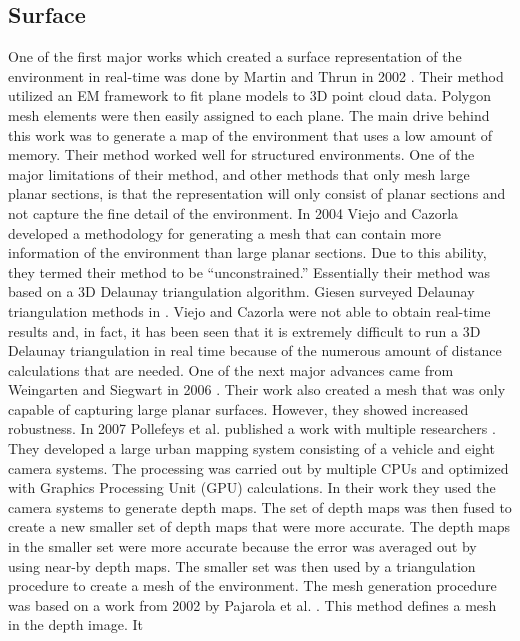 \subsection{Surface}

One of the first major works which created a surface representation of the
environment in real-time was done by Martin and Thrun in 2002
\cite{Martin2002}. Their method utilized an EM framework to fit plane
models to 3D point cloud data. Polygon mesh elements were then easily
assigned to each plane. The main drive behind this work was to generate a
map of the environment that uses a low amount of memory. Their  method
worked well for structured environments. One of the major limitations of
their method, and other methods that only mesh large planar sections, is
that the representation will only consist of planar sections and not
capture the fine detail of the environment. In 2004 Viejo and Cazorla
\cite{springerlink:10.1007/978-3-540-30463-0_30} developed a methodology
for generating a mesh that can contain more information of the environment
than large planar sections. Due to this ability, they termed their method
to be ``unconstrained.'' Essentially their method was based on a 3D
Delaunay triangulation algorithm. Giesen surveyed Delaunay triangulation
methods in \cite{Giesen2004}. Viejo and Cazorla were not able to obtain
real-time results and, in fact, it has been seen that it is extremely
difficult to run a 3D Delaunay triangulation in real time because of the
numerous amount of distance calculations that are needed.  One of the next
major advances came from Weingarten and Siegwart in 2006
\cite{Weingarten2006}. Their work also created a mesh that was only capable
of capturing large planar surfaces. However, they showed increased
robustness. In 2007 Pollefeys et al. published a work with multiple
researchers \cite{Akbarzadeh2006,Pollefeys2007}. They developed a large
urban mapping system consisting of a vehicle and eight camera systems. The
processing was carried out by multiple CPUs and optimized with Graphics
Processing Unit (GPU) calculations. In their work they used the camera
systems to generate depth maps. The set of depth maps was then fused to
create a new smaller set of depth maps that were more accurate. The depth
maps in the smaller set were more accurate because the error was averaged
out by using near-by depth maps. The smaller set was then used by a
triangulation procedure to create a mesh of the environment.  The mesh
generation procedure was based on a work from 2002 by Pajarola et al.
\cite{Pajarola2002}. This method defines a mesh in the depth image. It
